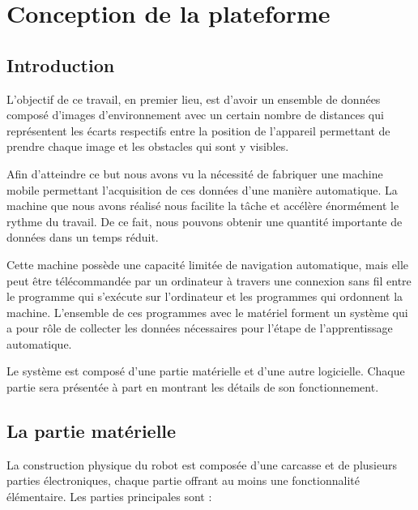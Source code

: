 \chapter{Conception de la plateforme}

\section{Introduction}

L'objectif de ce travail, en premier lieu, est d'avoir un ensemble de données
composé d'images d'environnement avec un certain nombre de distances qui
représentent  les écarts respectifs entre la position de l'appareil permettant
de prendre chaque image et les obstacles qui sont y visibles.

Afin d'atteindre ce but nous avons vu la nécessité de fabriquer une machine mobile
permettant l'acquisition de ces données d'une manière automatique. La machine que
nous avons réalisé nous facilite la tâche et accélère énormément le rythme du travail.
De ce fait, nous pouvons obtenir une quantité importante de données dans un temps
réduit.

Cette machine possède une capacité limitée de navigation automatique, mais
elle peut être télécommandée par un ordinateur à travers une connexion sans fil
entre le programme qui s'exécute sur l'ordinateur et les programmes qui ordonnent
la machine. L'ensemble de ces programmes avec le matériel forment un système
qui a pour rôle de collecter les données nécessaires pour l'étape de
l'apprentissage automatique.

Le système est composé d'une partie matérielle et d'une autre logicielle. Chaque
partie sera présentée à part en montrant les détails de son fonctionnement.

\section{La partie matérielle}

La construction physique du robot est composée d'une carcasse et de plusieurs
parties électroniques, chaque partie offrant au moins une fonctionnalité
élémentaire. Les parties principales sont :

